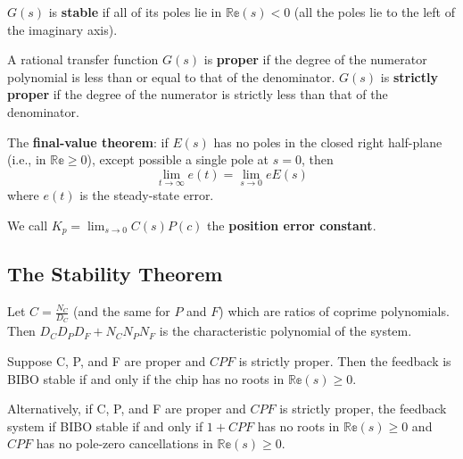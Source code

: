 \documentclass[12pt]{article}
\begin{document}
$G(s)$ is {\bf stable} if all of its poles lie in $\mathbb{Re}(s) < 0$ (all the poles lie to the left of the imaginary axis).

A rational transfer function $G(s)$ is {\bf proper} if the degree of the numerator polynomial is less than or equal to that of the denominator. $G(s)$ is {\bf strictly proper} if the degree of the numerator is strictly less than that of the denominator.

The {\bf final-value theorem}: if $E(s)$ has no poles in the closed right half-plane (i.e., in $\mathbb{Re} \geq 0$), except possible a single pole at $s = 0$, then \[ \lim_{t\to\infty} e(t) = \lim_{s\to 0} eE(s) \] where $e(t)$ is the steady-state error.

We call $K_p = \lim_{s\to 0} C(s) P(c)$ the {\bf position error constant}.

\subsection{The Stability Theorem}
Let $C = \frac{N_C}{D_C}$ (and the same for $P$ and $F$) which are ratios of coprime polynomials. Then $D_CD_PD_F + N_CN_PN_F$ is the characteristic polynomial of the system.

Suppose C, P, and F are proper and $CPF$ is strictly proper. Then the feedback is BIBO stable if and only if the chip has no roots in $\mathbb{Re}(s) \geq 0$.

Alternatively, if C, P, and F are proper and $CPF$ is strictly proper, the feedback system if BIBO stable if and only if $1 + CPF$ has no roots in $\mathbb{Re}(s) \geq 0$ and $CPF$ has no pole-zero cancellations in $\mathbb{Re}(s) \geq 0$.
\end{document}
